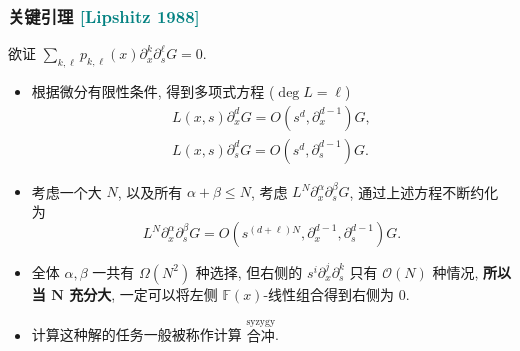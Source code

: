 \documentclass{ctexbeamer}
\newcommand{\cnote}[2][\footnotesize]{\textcolor{teal}{#1[#2]}}
\newcommand{\bigO}{\mathcal O}
\newcommand{\bbF}{\mathbb F}
\begin{document}
\begin{frame}
  \frametitle{关键引理 \cnote{Lipshitz 1988}}

  欲证 $\sum_{k, \ell} p_{k,\ell}(x) \partial_x^k \partial_s^\ell G = 0$.
  \begin{itemize}
    \item 根据微分有限性条件, 得到多项式方程 ($\deg L = \ell$)
    \begin{align}
      L(x,s) \partial_x^d G = O(s^d,\partial_x^{d-1}) G,\\
      L(x,s) \partial_s^d G = O(s^d,\partial_s^{d-1}) G.
    \end{align}
    \item 考虑一个大 $N$, 以及所有 $\alpha+\beta\leq N$, 考虑 $L^N \partial_x^\alpha \partial_s^\beta G$,
    通过上述方程不断约化为
    \begin{equation}
      L^N \partial_x^\alpha \partial_s^\beta G = O(s^{(d+\ell)N}, \partial_x^{d-1}, \partial_s^{d-1}) G.
    \end{equation}
    \item 全体 $\alpha, \beta$ 一共有 $\Omega(N^2)$ 种选择, 但右侧的 $s^i \partial_x^j \partial_s^k$
    只有 $\bigO(N)$ 种情况, \textbf{所以当 $\bm N$ 充分大}, 一定可以将左侧 $\bbF(x)$-线性组合得到右侧为 $0$. \hfill \qedhere
    \item 计算这种解的任务一般被称作计算 $\stackrel{\text{syzygy}}{\text{合冲}}$.
  \end{itemize}

\end{frame}
\end{document}
